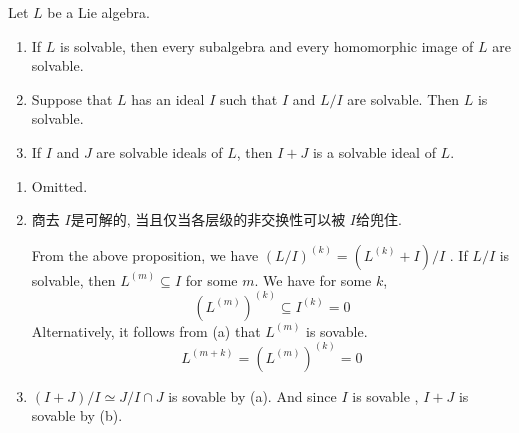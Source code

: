\documentclass[../main.tex]{subfiles}
\begin{document}
\begin{lemma}{}{}
Let $L$ be a Lie algebra.

\begin{enumerate}
\item[(a)] If $L$ is solvable, then every subalgebra and every homomorphic image of $L$ are solvable.

\item[(b)] Suppose that $L$ has an ideal $I$ such that $I$ and $L/I$ are solvable. Then $L$ is solvable.

\item[(c)] If $I$ and $J$ are solvable ideals of $L$, then $I + J$ is a solvable ideal of $L$.
\end{enumerate}
\end{lemma}
\begin{enumerate}
    \item [(a)] Omitted.
    \item [(b)] 
    \begin{note}
        商去 \(  I  \)是可解的, 当且仅当各层级的非交换性可以被 \(  I  \)给兜住. 
    \end{note}From the above proposition, we have \(  \left( L/I \right)^{\left( k \right) }= \left( L^{\left( k \right) }+ I \right)/I   \) . If \(  L/I  \) is solvable, then \(  L^{\left( m \right) }\subseteq I  \) for some \(  m  \).  We have for some \(  k  \), \[
    \left( L^{\left( m \right) } \right)^{\left( k \right) }\subseteq I^{\left( k \right) }= 0 
    \]  Alternatively, it follows from (a) that \(  L^{\left( m \right) }  \) is sovable. \[
  L^{\left( m+ k \right) }=   \left( L^{\left( m \right) } \right)^{\left( k \right) }=  0
    \]
    \item [(c)] \(  \left( I+ J \right)/I\simeq  J/I\cap J   \) is sovable by (a). And since \(  I  \) is sovable  , \(  I+ J  \) is sovable by (b). 
\end{enumerate}
\end{document}
